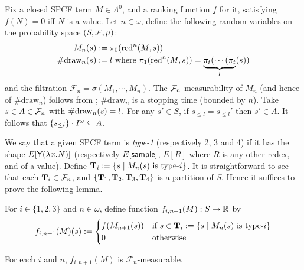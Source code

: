 Fix a closed SPCF term $M \in \Lambda^0$, and a ranking function $f$ for it, satisfying $f(N) = 0$ iff $N$ is a value.
Let $n \in \omega$, define the following random variables on the probability space $(S, \mathcal{F}, \mu)$:
\begin{align*}
M_n(s) &:= \pi_0 (\operatorname{red}^n(M, s))\\
\#\mathrm{draw}_{n}(s) &:= l \textrm{ where $\pi_1 (\operatorname{red}^n(M, s)) = \underbrace{\pi_t( \cdots (\pi_t}_l(s))$}
\end{align*}
and the filtration $\mathcal{F}_n = \sigma(M_1, \cdots, M_n)$.
The $\mathcal{F}_n$-measurability of $M_n$ (and hence of $\#\mathrm{draw}_n$) follows from \citep{DBLP:conf/icfp/BorgstromLGS16};
$\#\mathrm{draw}_n$ is a stopping time (bounded by $n$).
Take $s \in A \in \mathcal{F}_n$ with $\#\mathrm{draw}_{n}(s) = l$.
For any $s'\in S$, if $s_{\leq l} = s_{\leq l}'$ then $s' \in A$.
It follows that ${\{s_{\leq l}\} \cdot I^\omega} \subseteq A$.


We say that a given SPCF term is \emph{type-1} (respectively 2, 3 and 4) if it has the shape $E[\textsf{Y} (\lambda x. N)]$ (respectively $E[\textsf{sample}]$, $E[R]$ where $R$ is any other redex, and of a value).
Define $\mathbf{T}_i := 
\{s \mid M_n(s) \hbox{ is type-$i$}\}$.
It is straightforward to see that each $\mathbf{T}_i \in \mathcal{F}_n$, and $\{\mathbf{T}_1, \mathbf{T}_2, \mathbf{T}_3, \mathbf{T}_4\}$ is a partition of $S$.
Hence it suffices to prove the following lemma.

\iffalse
For $i \in \{1, 2, 3\}$ and $n \in \omega$, define function $f_{i, n+1}(M) : S \to \mathbb{R}$ by
\[
f_{i, n+1}(M)(s) :=
\begin{cases}
f(M_{n+1}(s)) & \hbox{if }s \in \mathbf{T}_i := 
\{s \mid M_n(s) \textrm{ is type-$i$}\}\\
0 & \textrm{otherwise}
\end{cases}
\]
\begin{lemma}
\label{lem:inde}
For each $i$ and $n$, $f_{i, n+1}(M)$ is %
$\mathcal{F}_{n}$-measurable.
\end{lemma}

